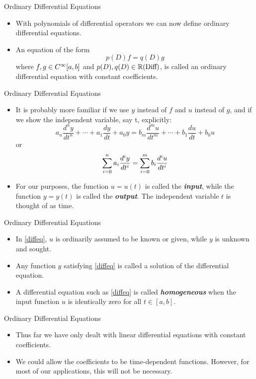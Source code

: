 \begin{frame}
Ordinary Differential Equations
 \begin{itemize}
 \item With polynomials of differential operators we can now
 define ordinary differential equations.
 \item An equation of the form
 \[p(D)f=q(D)g\]
 where  $f,g\in C^\infty[a,b]$ and $p(D),q(D)\in \mathbb{R}(\text{Diff})$,
 is called an ordinary differential equation with constant
 coefficients.
\end{itemize}
\end{frame}
\begin{frame}
Ordinary Differential Equations
 \begin{itemize}
 \item It is probably more familiar if we use $y$
 instead of $f$ and $u$ instead of $g$, and if we show the
 independent variable, say t, explicitly:
 \[a_n\frac{d^ny}{dt^n}+\cdots +a_1\frac{dy}{dt}+a_0y =
 b_m\frac{d^mu}{dt^m}+\cdots + b_1\frac{du}{dt}+b_0u\]
 or
\begin{equation}\label{diffeq}
\sum_{i=0}^{n}a_i\frac{d^iy}{dt^i} = \sum_{i=0}^{m}b_i\frac{d^iu}{dt^i}
\end{equation}
 \item For our purposes, the function $u=u(t)$ is called the \textit{\textbf{input}},
 while the function $y=y(t)$ is called the \textit{\textbf{output}}.  The
 independent variable $t$ is thought of as time.
\end{itemize}
\end{frame}
\begin{frame}
Ordinary Differential Equations
 \begin{itemize}
 \item In \eqref{diffeq}, $u$ is ordinarily assumed to be known or given,
 while $y$ is unknown and sought.
 \item Any function $y$
 satisfying \eqref{diffeq} is called a solution of the
 differential equation.
 \item A differential equation such as \eqref{diffeq} is called
 \textit{\textbf{homogeneous}} when the input function $u$ is identically zero
 for all $t\in[a,b]$.
\end{itemize}
\end{frame}
\begin{frame}
Ordinary Differential Equations
 \begin{itemize}
 \item Thus far we have only dealt with linear differential equations
 with constant coefficients.
 \item We could allow the coefficients to be time-dependent
 functions.  However, for most of our applications, this will not
 be necessary.
\end{itemize}
\end{frame}
